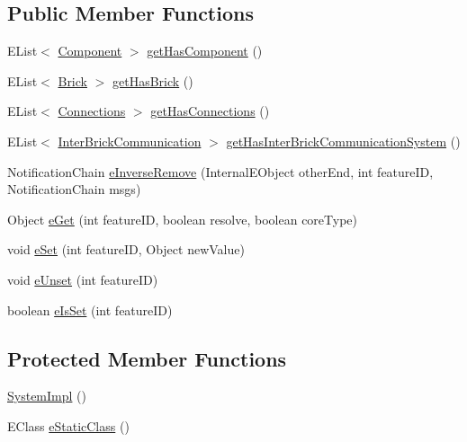 \subsection*{Public Member Functions}
\begin{DoxyCompactItemize}
\item 
E\-List$<$ \hyperlink{interfaceshootingmachineemfmodel_1_1_component}{Component} $>$ \hyperlink{classshootingmachineemfmodel_1_1impl_1_1_system_impl_ae7f2544d43d2a53d5679ae3d511cffd4}{get\-Has\-Component} ()
\item 
E\-List$<$ \hyperlink{interfaceshootingmachineemfmodel_1_1_brick}{Brick} $>$ \hyperlink{classshootingmachineemfmodel_1_1impl_1_1_system_impl_af311fd2939009d1106d5643403259d30}{get\-Has\-Brick} ()
\item 
E\-List$<$ \hyperlink{interfaceshootingmachineemfmodel_1_1_connections}{Connections} $>$ \hyperlink{classshootingmachineemfmodel_1_1impl_1_1_system_impl_a6573b6b1522a452bd631415525126000}{get\-Has\-Connections} ()
\item 
E\-List$<$ \hyperlink{interfaceshootingmachineemfmodel_1_1_inter_brick_communication}{Inter\-Brick\-Communication} $>$ \hyperlink{classshootingmachineemfmodel_1_1impl_1_1_system_impl_aeb13534d36d6f772d317c7c2c8b47241}{get\-Has\-Inter\-Brick\-Communication\-System} ()
\item 
Notification\-Chain \hyperlink{classshootingmachineemfmodel_1_1impl_1_1_system_impl_a4ef1dc36784a335316c624fd778ec564}{e\-Inverse\-Remove} (Internal\-E\-Object other\-End, int feature\-I\-D, Notification\-Chain msgs)
\item 
Object \hyperlink{classshootingmachineemfmodel_1_1impl_1_1_system_impl_a28ff9c5997db94c09a739bce5be2e0bf}{e\-Get} (int feature\-I\-D, boolean resolve, boolean core\-Type)
\item 
void \hyperlink{classshootingmachineemfmodel_1_1impl_1_1_system_impl_a6e21875d7e40ab01dc3cf0900a1b1bbd}{e\-Set} (int feature\-I\-D, Object new\-Value)
\item 
void \hyperlink{classshootingmachineemfmodel_1_1impl_1_1_system_impl_a9ed058c6f2c056facc0881df68c482cb}{e\-Unset} (int feature\-I\-D)
\item 
boolean \hyperlink{classshootingmachineemfmodel_1_1impl_1_1_system_impl_ae875401c9c7d8e3ec0df25c4eb70aa97}{e\-Is\-Set} (int feature\-I\-D)
\end{DoxyCompactItemize}
\subsection*{Protected Member Functions}
\begin{DoxyCompactItemize}
\item 
\hyperlink{classshootingmachineemfmodel_1_1impl_1_1_system_impl_ab8763d4e478ee7fdc744f216344e7626}{System\-Impl} ()
\item 
E\-Class \hyperlink{classshootingmachineemfmodel_1_1impl_1_1_system_impl_ac6dfee1619527a2589f4bab30412a35a}{e\-Static\-Class} ()
\end{DoxyCompactItemize}
